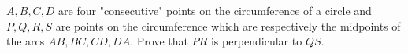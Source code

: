 $ A,B,C,D$ are four "consecutive" points on the circumference of a circle and $ P, Q, R, S$ are points on the circumference which are respectively the midpoints of the arcs $ AB,BC,CD,DA$. Prove that $ PR$ is perpendicular to $ QS$.